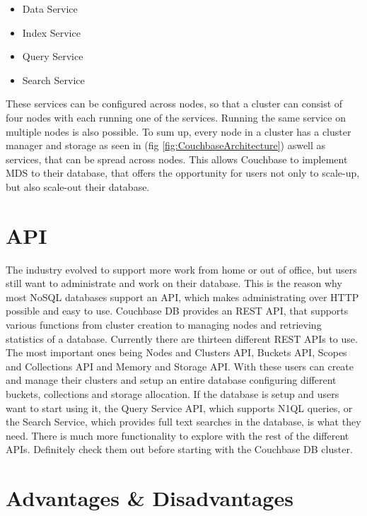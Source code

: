\begin{itemize}
    \item Data Service
    \item Index Service
    \item Query Service
    \item Search Service
\end{itemize}
These services can be configured across nodes, so that a cluster can consist of four nodes with each running one of the services. Running the same service on multiple nodes is also possible. \parencite{CouchbaseIntroduction} \newline
To sum up, every node in a cluster has a cluster manager and storage as seen in (fig \ref{fig:CouchbaseArchitecture}) aswell as services, that can be spread across nodes. This allows Couchbase to implement \ac{MDS} to their database, that offers the opportunity for users not only to scale-up, but also scale-out their database. \parencite{CouchbasePaper}


\section{API}
The industry evolved to support more work from home or out of office, but users still want to administrate and work on their database. This is the reason why most \ac{NoSQL} databases support an \ac{API}, which makes administrating over \ac{HTTP} possible and easy to use.\newline
Couchbase DB provides an \ac{REST} \ac{API}, that supports various functions from cluster creation to managing nodes and retrieving statistics of a database. Currently there are thirteen different \ac{REST} \acp{API} to use. The most important ones being Nodes and Clusters \ac{API}, Buckets \ac{API}, Scopes and Collections \ac{API} and Memory and Storage \ac{API}. With these users can create and manage their clusters and setup an entire database configuring different buckets, collections and storage allocation. If the database is setup and users want to start using it, the Query Service \ac{API}, which supports \ac{N1QL} queries, or the Search Service, which provides full text searches in the database, is what they need. \parencite{CouchbaseAPI}\newline
There is much more functionality to explore with the rest of the different \acp{API}. Definitely check them out before starting with the Couchbase DB cluster.


\section{Advantages \& Disadvantages}

